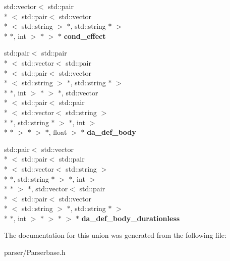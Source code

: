 \begin{DoxyCompactItemize}
\item 
\hypertarget{unionParserBase_1_1STYPE_____a79e1c1d70b78c5bd090118c2fbf46781}{std\+::vector$<$ std\+::pair\\*
$<$ std\+::pair$<$ std\+::vector\\*
$<$ std\+::string $>$ $\ast$, std\+::string $\ast$ $>$\\*
 $\ast$, int $>$ $\ast$ $>$ $\ast$ {\bfseries cond\+\_\+effect}}\label{unionParserBase_1_1STYPE_____a79e1c1d70b78c5bd090118c2fbf46781}

\item 
\hypertarget{unionParserBase_1_1STYPE_____a3db853e7495c942705760c89cdeaa79e}{std\+::pair$<$ std\+::pair\\*
$<$ std\+::vector$<$ std\+::pair\\*
$<$ std\+::pair$<$ std\+::vector\\*
$<$ std\+::string $>$ $\ast$, std\+::string $\ast$ $>$\\*
 $\ast$, int $>$ $\ast$ $>$ $\ast$, std\+::vector\\*
$<$ std\+::pair$<$ std\+::pair\\*
$<$ std\+::vector$<$ std\+::string $>$\\*
 $\ast$, std\+::string $\ast$ $>$ $\ast$, int $>$\\*
 $\ast$ $>$ $\ast$ $>$ $\ast$, float $>$ $\ast$ {\bfseries da\+\_\+def\+\_\+body}}\label{unionParserBase_1_1STYPE_____a3db853e7495c942705760c89cdeaa79e}

\item 
\hypertarget{unionParserBase_1_1STYPE_____ab31334cd248bfb4f019532d0689777d6}{std\+::pair$<$ std\+::vector\\*
$<$ std\+::pair$<$ std\+::pair\\*
$<$ std\+::vector$<$ std\+::string $>$\\*
 $\ast$, std\+::string $\ast$ $>$ $\ast$, int $>$\\*
 $\ast$ $>$ $\ast$, std\+::vector$<$ std\+::pair\\*
$<$ std\+::pair$<$ std\+::vector\\*
$<$ std\+::string $>$ $\ast$, std\+::string $\ast$ $>$\\*
 $\ast$, int $>$ $\ast$ $>$ $\ast$ $>$ $\ast$ {\bfseries da\+\_\+def\+\_\+body\+\_\+durationless}}\label{unionParserBase_1_1STYPE_____ab31334cd248bfb4f019532d0689777d6}

\end{DoxyCompactItemize}


The documentation for this union was generated from the following file\+:\begin{DoxyCompactItemize}
\item 
parser/Parserbase.\+h\end{DoxyCompactItemize}
